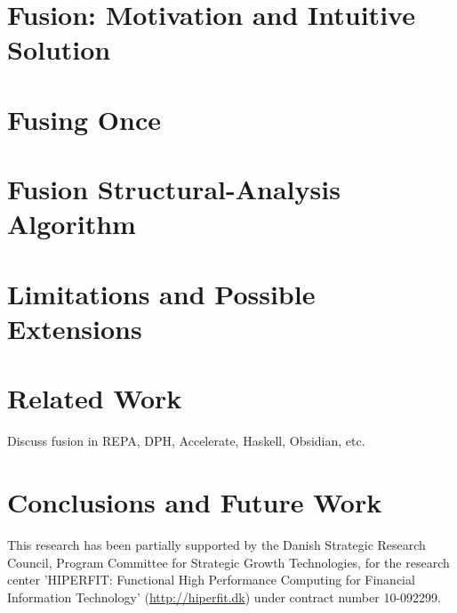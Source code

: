 \documentclass{sigplanconf}  %
\begin{document}
\section{Fusion: Motivation and Intuitive Solution}
\label{sec:Intuition}

\section{Fusing Once}
\label{sec:FusingOnce}

\section{Fusion Structural-Analysis Algorithm}
\label{sec:FusionPrg}

\section{Limitations and Possible Extensions}
\label{sec:Discuss}


\section{Related Work}
\label{sec:RelWork}

Discuss fusion in REPA, DPH, Accelerate, Haskell, Obsidian, etc.

\section{Conclusions and Future Work}
\label{sec:Concl}




%



\enlargethispage{\baselineskip}
\acks
This research has been partially supported by the Danish
Strategic Research Council, Program Committee for Strategic Growth
Technologies, for the research center 'HIPERFIT: Functional High
Performance Computing for Financial Information Technology'
(\url{http://hiperfit.dk}) under contract number 10-092299.
\end{document}
